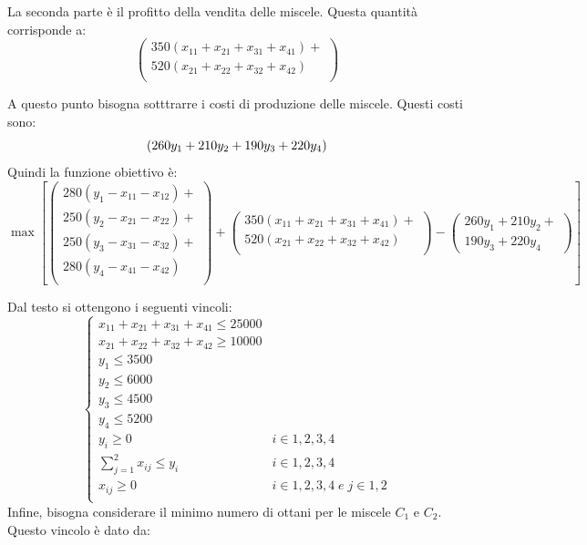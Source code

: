 \documentclass{article}
\begin{document}
La seconda parte è il profitto della vendita delle miscele. Questa quantità 
corrisponde a:
\begin{equation*}
 \begin{pmatrix}
   350(x_{11} + x_{21} + x_{31} + x_{41})+ \\ 
   520(x_{21} + x_{22} + x_{32} + x_{42})  \\
  \end{pmatrix}
\end{equation*}

A questo punto bisogna sotttrarre i costi di produzione delle miscele. Questi 
costi sono:
\begin{equation*}
   (260y_1 + 210y_2 + 190y_3 + 220y_4) \\ 
\end{equation*}
Quindi la funzione obiettivo è:
\begin{equation*}
  \max [ 
  \begin{pmatrix}
   280(y_1 - x_{11} - x_{12})+ \\ 
   250(y_2 - x_{21} -x_{22}) +\\
   250(y_3 - x_{31} -x_{32}) +\\
   280(y_4 - x_{41} -x_{42})\\
  \end{pmatrix} + 
  \begin{pmatrix}
   350(x_{11} + x_{21} + x_{31} + x_{41})+ \\ 
   520(x_{21} + x_{22} + x_{32} + x_{42}) \\
  \end{pmatrix} - 
  \begin{pmatrix}
   260y_1 + 210y_2 + \\
  190y_3 + 220y_4
  \end{pmatrix}
  ]
\end{equation*}

Dal testo si ottengono i seguenti vincoli:
\begin{equation*}
  \begin{cases}
    x_{11} + x_{21} + x_{31} + x_{41} \leq 25000 \\
    x_{21} + x_{22} + x_{32} + x_{42} \geq 10000 \\
    y_1 \leq 3500 \\
    y_2 \leq 6000 \\
    y_3 \leq 4500 \\
    y_4 \leq 5200 \\
    y_i \geq 0 & i \in {1,2,3,4}\\
    \sum_{j=1}^2{x_{ij}} \leq y_i &  i \in {1,2,3,4} \\
    x_{ij} \geq 0 &  i \in {1,2,3,4}\;e\;  j \in {1,2}\\
  \end{cases}
\end{equation*}
Infine, bisogna considerare il minimo numero di ottani per le miscele $C_1$ e 
$C_2$. Questo vincolo è dato da:
\end{document}
